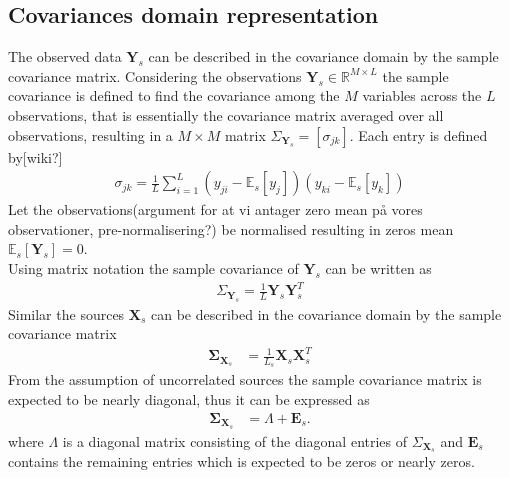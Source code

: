 \subsection{Covariances domain representation}
The observed data $\textbf{Y}_s$ can be described in the covariance domain by the sample covariance matrix. Considering the observations $\textbf{Y}_s\in \mathbb{R}^{M\times L}$ the sample covariance is defined to find the covariance among the $M$ variables across the $L$ observations, that is essentially the covariance matrix averaged over all observations, resulting in a $M\times M$ matrix $\Sigma_{\textbf{Y}_s}=[\sigma_{jk}]$. Each entry is defined by[wiki?] 
\begin{align*}
\sigma_{jk}= \frac{1}{L}\sum_{i=1}^{L}(y_{ji}-\mathbb{E}_s[y_j])(y_{ki}-\mathbb{E}_s[y_k])
\end{align*}
Let the observations(argument for at vi antager zero mean på vores observationer, pre-normalisering?) be normalised resulting in zeros mean $\mathbb{E}_s[\textbf{Y}_s]=0$. \\
Using matrix notation the sample covariance of $\textbf{Y}_s$ can be written as
\begin{align*}
\Sigma_{\textbf{Y}_s}= \frac{1}{L}\textbf{Y}_s\textbf{Y}_s^T
\end{align*}  
Similar the sources $\textbf{X}_s$ can be described in the covariance domain by the sample covariance matrix
\begin{align*}
\boldsymbol{\Sigma}_{\mathbf{X}_s} &= \frac{1}{L_s}\textbf{X}_s\textbf{X}_s^{T}
\end{align*}
From the assumption of uncorrelated sources the sample covariance matrix is expected to be nearly diagonal, thus it can be expressed as 
\begin{align*}
\boldsymbol{\Sigma}_{\mathbf{X}_s} &= \Lambda + \textbf{E}_s.
\end{align*}
where $\Lambda$ is a diagonal matrix consisting of the diagonal entries of $\Sigma_{\textbf{X}_s}$ and $\textbf{E}_s$ contains the remaining entries which is expected to be zeros or nearly zeros\cite{Balkan2015}.\\ \\

